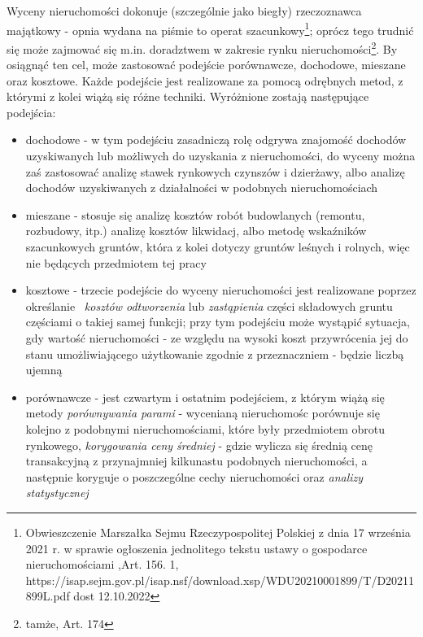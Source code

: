 \documentclass[a4paper,12pt,twoside,openany]{report}
\begin{document}
Wyceny nieruchomości dokonuje (szczególnie jako biegły) rzeczoznawca majątkowy - opnia wydana na piśmie to operat szacunkowy\footnote{Obwieszczenie Marszałka Sejmu Rzeczypospolitej Polskiej z dnia 17 września 2021 r. w sprawie ogłoszenia jednolitego tekstu ustawy o gospodarce nieruchomościami ,Art. 156. 1, https://isap.sejm.gov.pl/isap.nsf/download.xsp/WDU20210001899/T/D20211899L.pdf dost 12.10.2022}; oprócz tego trudnić się może zajmować się m.in. doradztwem w zakresie rynku nieruchomości\footnote{tamże, Art. 174}. By osiągnąć ten cel, może zastosować podejście porównawcze, dochodowe, mieszane oraz kosztowe. Każde podejście jest realizowane za pomocą odrębnych metod, z którymi z kolei wiążą się różne techniki.
Wyróżnione zostają następujące podejścia:
\begin{itemize}

\item dochodowe - w tym podejściu zasadniczą rolę odgrywa znajomość dochodów uzyskiwanych lub możliwych do uzyskania z nieruchomości, do wyceny można zaś zastosować analizę stawek rynkowych czynszów i dzierżawy, albo analizę dochodów uzyskiwanych z działalności w podobnych nieruchomościach

\item mieszane - stosuje się analizę kosztów robót budowlanych (remontu, rozbudowy, itp.) analizę kosztów likwidacj, albo metodę wskaźników szacunkowych gruntów, która z kolei dotyczy gruntów leśnych i rolnych, więc nie będących przedmiotem tej pracy


\item kosztowe - trzecie podejście do wyceny nieruchomości jest realizowane poprzez określanie\ \textit{ kosztów odtworzenia} lub \textit{zastąpienia} części składowych gruntu częściami o takiej samej funkcji; przy tym podejściu może wystąpić sytuacja, gdy wartość nieruchomości - ze względu na wysoki koszt przywrócenia jej do stanu umożliwiającego użytkowanie zgodnie z przeznaczniem - będzie liczbą ujemną

\item porównawcze - jest czwartym i ostatnim podejściem, z którym wiążą się metody \textit{porównywania parami} - wycenianą nieruchomośc porównuje się kolejno z podobnymi nieruchomościami, które były przedmiotem obrotu rynkowego, \textit{korygowania ceny średniej} - gdzie wylicza się średnią cenę transakcyjną z przynajmniej kilkunastu podobnych nieruchomości, a następnie koryguje o poszczególne cechy nieruchomości oraz \textit {analizy statystycznej}

\end{itemize}
\end{document}

